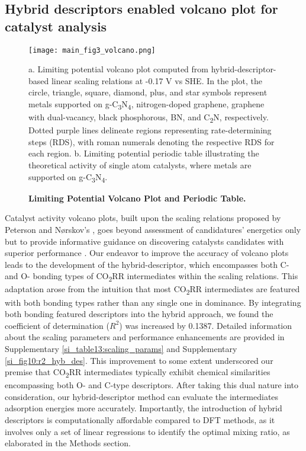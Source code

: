 
\subsection{Hybrid descriptors enabled volcano plot for catalyst analysis}

\begin{figure}[htbp]
    \centering
    \texttt{[image: main\_fig3\_volcano.png]}
    \caption{\textbf{Limiting Potential Volcano Plot and Periodic Table.}}
    a. Limiting potential volcano plot computed from hybrid-descriptor-based linear scaling relations at -0.17 V vs SHE.
    In the plot, the circle, triangle, square, diamond, plus, and star symbols represent metals supported on g-C\textsubscript{3}N\textsubscript{4}, nitrogen-doped graphene, graphene with dual-vacancy, black phosphorous, BN, and C\textsubscript{2}N, respectively.
    Dotted purple lines delineate regions representing rate-determining steps (RDS), with roman numerals denoting the respective RDS for each region.
    b. Limiting potential periodic table illustrating the theoretical activity of single atom catalysts, where metals are supported on g-C\textsubscript{3}N\textsubscript{4}.
    \label{main_fig3:volcano}
\end{figure}

Catalyst activity volcano plots, built upon the scaling relations proposed by Peterson and Nørskov's \cite{peterson2012activity},
goes beyond assessment of candidatures' energetics only but to provide informative guidance on discovering catalysts candidates with superior performance \cite{balandin1969modern, deutschmann2000heterogeneous}.
Our endeavor to improve the accuracy of volcano plots leads to the development of the hybrid-descriptor,
which encompasses both C- and O- bonding types of CO\textsubscript{2}RR intermediates within the scaling relations.
This adaptation arose from the intuition that most CO\textsubscript{2}RR intermediates are featured with both bonding types rather than any single one in dominance.
By integrating both bonding featured descriptors into the hybrid approach, we found the coefficient of determination ($R^2$) was increased by 0.1387.
Detailed information about the scaling parameters and performance enhancements are provided in Supplementary \cref{si_table13:scaling_params} and Supplementary \cref{si_fig10:r2_hyb_des}.
This improvement to some extent underscored our premise that CO\textsubscript{2}RR intermediates typically exhibit chemical similarities encompassing both O- and C-type descriptors.
After taking this dual nature into consideration, our hybrid-descriptor method can evaluate the intermediates adsorption energies more accurately.
Importantly, the introduction of hybrid descriptors is computationally affordable compared to DFT methods,
as it involves only a set of linear regressions to identify the optimal mixing ratio, as elaborated in the Methods section.


